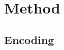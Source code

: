 \documentclass[conference]{IEEEtran}
\begin{document}
\section{Method}


\subsection{Encoding}


\end{document}
